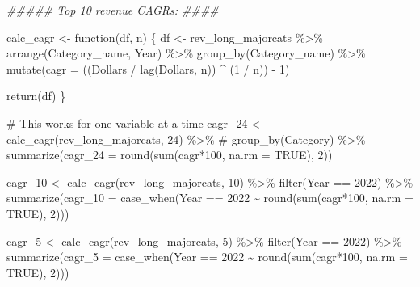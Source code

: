 \documentclass[
  letterpaper,
  DIV=11,
  numbers=noendperiod]{scrreport}
\newenvironment{Shaded}{\begin{snugshade}}{\end{snugshade}}
\newcommand{\AttributeTok}[1]{\textcolor[rgb]{0.40,0.45,0.13}{#1}}
\newcommand{\CommentTok}[1]{\textcolor[rgb]{0.37,0.37,0.37}{#1}}
\newcommand{\ConstantTok}[1]{\textcolor[rgb]{0.56,0.35,0.01}{#1}}
\newcommand{\ControlFlowTok}[1]{\textcolor[rgb]{0.00,0.23,0.31}{#1}}
\newcommand{\DecValTok}[1]{\textcolor[rgb]{0.68,0.00,0.00}{#1}}
\newcommand{\DocumentationTok}[1]{\textcolor[rgb]{0.37,0.37,0.37}{\textit{#1}}}
\newcommand{\FunctionTok}[1]{\textcolor[rgb]{0.28,0.35,0.67}{#1}}
\newcommand{\NormalTok}[1]{\textcolor[rgb]{0.00,0.23,0.31}{#1}}
\newcommand{\OtherTok}[1]{\textcolor[rgb]{0.00,0.23,0.31}{#1}}
\newcommand{\SpecialCharTok}[1]{\textcolor[rgb]{0.37,0.37,0.37}{#1}}
\begin{document}
\begin{Shaded}
\begin{Highlighting}[]
\DocumentationTok{\#\#\#\#\# Top 10 revenue CAGRs: \#\#\#\#}


\NormalTok{calc\_cagr }\OtherTok{\textless{}{-}} \ControlFlowTok{function}\NormalTok{(df, n) \{}
\NormalTok{  df }\OtherTok{\textless{}{-}}\NormalTok{ rev\_long\_majorcats }\SpecialCharTok{\%\textgreater{}\%}
    \FunctionTok{arrange}\NormalTok{(Category\_name, Year) }\SpecialCharTok{\%\textgreater{}\%}
    \FunctionTok{group\_by}\NormalTok{(Category\_name) }\SpecialCharTok{\%\textgreater{}\%}
    \FunctionTok{mutate}\NormalTok{(}\AttributeTok{cagr =}\NormalTok{ ((Dollars }\SpecialCharTok{/} \FunctionTok{lag}\NormalTok{(Dollars, n)) }\SpecialCharTok{\^{}}\NormalTok{ (}\DecValTok{1} \SpecialCharTok{/}\NormalTok{ n)) }\SpecialCharTok{{-}} \DecValTok{1}\NormalTok{)}

  \FunctionTok{return}\NormalTok{(df)}
\NormalTok{\}}

\CommentTok{\# This works for one variable at a time}
\NormalTok{cagr\_24 }\OtherTok{\textless{}{-}} \FunctionTok{calc\_cagr}\NormalTok{(rev\_long\_majorcats, }\DecValTok{24}\NormalTok{) }\SpecialCharTok{\%\textgreater{}\%} 
     \CommentTok{\# group\_by(Category) \%\textgreater{}\%}
  \FunctionTok{summarize}\NormalTok{(}\AttributeTok{cagr\_24 =} \FunctionTok{round}\NormalTok{(}\FunctionTok{sum}\NormalTok{(cagr}\SpecialCharTok{*}\DecValTok{100}\NormalTok{, }\AttributeTok{na.rm =} \ConstantTok{TRUE}\NormalTok{), }\DecValTok{2}\NormalTok{))}

\NormalTok{cagr\_10 }\OtherTok{\textless{}{-}} \FunctionTok{calc\_cagr}\NormalTok{(rev\_long\_majorcats, }\DecValTok{10}\NormalTok{) }\SpecialCharTok{\%\textgreater{}\%} 
  \FunctionTok{filter}\NormalTok{(Year }\SpecialCharTok{==} \DecValTok{2022}\NormalTok{) }\SpecialCharTok{\%\textgreater{}\%}
  \FunctionTok{summarize}\NormalTok{(}\AttributeTok{cagr\_10 =} \FunctionTok{case\_when}\NormalTok{(Year }\SpecialCharTok{==} \DecValTok{2022} \SpecialCharTok{\textasciitilde{}} \FunctionTok{round}\NormalTok{(}\FunctionTok{sum}\NormalTok{(cagr}\SpecialCharTok{*}\DecValTok{100}\NormalTok{, }\AttributeTok{na.rm =} \ConstantTok{TRUE}\NormalTok{), }\DecValTok{2}\NormalTok{)))}

\NormalTok{cagr\_5 }\OtherTok{\textless{}{-}} \FunctionTok{calc\_cagr}\NormalTok{(rev\_long\_majorcats, }\DecValTok{5}\NormalTok{) }\SpecialCharTok{\%\textgreater{}\%} 
  \FunctionTok{filter}\NormalTok{(Year }\SpecialCharTok{==} \DecValTok{2022}\NormalTok{) }\SpecialCharTok{\%\textgreater{}\%}
  \FunctionTok{summarize}\NormalTok{(}\AttributeTok{cagr\_5 =} \FunctionTok{case\_when}\NormalTok{(Year }\SpecialCharTok{==} \DecValTok{2022} \SpecialCharTok{\textasciitilde{}} \FunctionTok{round}\NormalTok{(}\FunctionTok{sum}\NormalTok{(cagr}\SpecialCharTok{*}\DecValTok{100}\NormalTok{, }\AttributeTok{na.rm =} \ConstantTok{TRUE}\NormalTok{), }\DecValTok{2}\NormalTok{)))}


\end{Highlighting}
\end{Shaded}
\end{document}
